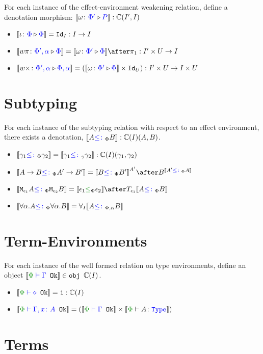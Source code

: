 \documentclass{report}
\begin{document}
For each instance of the effect-environment weakening relation, define a denotation morphism: ${\bf [\![}\omega \colon {\color{blue}\Phi'} \triangleright {\color {blue} P}{\bf ]\!]}: \mathbb{C}(I', I)$

\begin{itemize}
    \item ${\bf [\![}\iota \colon {\color{blue}\Phi} \triangleright {\color {blue} \Phi}{\bf ]\!]} = \texttt{Id}_{I}: I \rightarrow I$
    \item $\deno{\wrel{w\pi}{\P',\a}{\P}} = \deno{\wrelw{\P'}{\P}}\after \p: I'\times U\rightarrow I$
    \item ${\bf [\![}w\times \colon {\color{blue}\Phi',\alpha} \triangleright {\color {blue} \Phi,\alpha}{\bf ]\!]} = ({\bf [\![}\omega \colon {\color{blue}\Phi'} \triangleright {\color {blue} \Phi}{\bf ]\!]}\times \texttt{Id}_{U}): I'\times U\rightarrow I\times U$
\end{itemize}

\section{Subtyping}

For each instance of the subtyping relation with respect  to an effect environment, there exists a denotation, ${\bf [\![}A{\color{blue} \leq\colon}_\Phi B{\bf ]\!]}: \mathbb{C}(I)(A, B)$.

\begin{itemize}
    \item ${\bf [\![}\gamma_1{\color{blue} \leq\colon}_\Phi \gamma_2{\bf ]\!]} = {\bf [\![}\gamma_1{\color{blue} \leq\colon}_\gamma \gamma_2{\bf ]\!]} : \mathbb{C}(I)(\gamma_1, \gamma_2)$
    \item $\deno{\ab \subtypep \fntype{A'}{B'}} = \deno{B\subtypep B'}^{A'}\after B^{\deno{A'\subtypep A}}$
    \item $\deno{\M{\e_1}{A}\subtypep\M{\e_2}{B}} = \deno{\e_1\subeffectp\e_2}\after\T{\e_1}{\deno{A\subtypep B}}$
    \item ${\bf [\![}\forall \alpha. A{\color{blue} \leq\colon}_\Phi\forall \alpha. B{\bf ]\!]} = \forall_I{{\bf [\![}A{\color{blue} \leq\colon}_{\Phi, \alpha} B{\bf ]\!]}}$
\end{itemize}

\section{Term-Environments}
For each instance of the well formed relation on type environments, define an object $\deno{\wellformedok{\P}{\G}}\in\obj\C(I)$.

\begin{itemize}
    \item $\deno{\wellformedok{\P}{\nil}} = \1: \C(I)$
    \item $\deno{\wellformedok{\P}{\gax}} = (\deno{\wellformedok{\P}{\G}} \times \deno{\typerelation{\P}{A}{\type}})$
\end{itemize}

\section{Terms}
\end{document}
